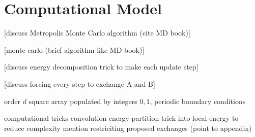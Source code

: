 \documentclass[10pt]{article}
\begin{document}
%

\section{Computational Model}
[discuss Metropolis Monte Carlo algorithm (cite MD book)]

[monte carlo (brief algorithm like MD book)]

[discuss energy decomposition trick to make each update step]

[discuss forcing every step to exchange A and B]

order $d$ square array populated by integers $0, 1$, periodic boundary conditions


computational tricks
    convolution
    energy partition trick into local energy to reduce complexity
    mention restriciting proposed exchanges (point to appendix)
\end{document}
